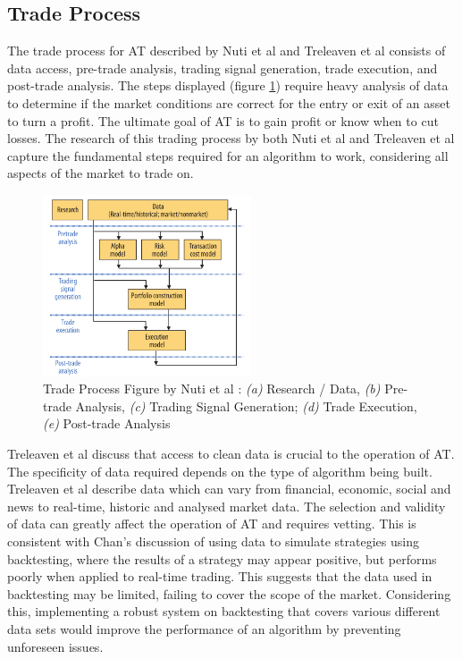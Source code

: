 \subsection{Trade Process}
\label{sec:related:algoTrading:tradeprocess}
The trade process for AT described by Nuti et al \cite{ART:Nuti:2011} and Treleaven et al  \cite{ART:Treleaven:2013} consists of data access, pre-trade analysis, trading signal generation, trade execution, and post-trade analysis. The steps displayed (figure \ref{fig:related:tradeprocess}) require heavy analysis of data to determine if the market conditions are correct for the entry or exit of an asset to turn a profit. The ultimate goal of AT is to gain profit or know when to cut losses. The research of this trading process by both Nuti et al \cite{ART:Nuti:2011} and Treleaven et al \cite{ART:Treleaven:2013} capture the fundamental steps required for an algorithm to work, considering all aspects of the market to trade on.

\begin{figure}[htb]
    \centering
	\includegraphics[width=0.55\textwidth]{content/graphics/AT-trade_process}
	\caption{Trade Process Figure by Nuti et al \cite{ART:Nuti:2011}: \textit{(a)} Research / Data, \textit{(b)} Pre-trade Analysis, \textit{(c)} Trading Signal Generation; \textit{(d)} Trade Execution, \textit{(e)} Post-trade Analysis }
	\label{fig:related:tradeprocess}
\end{figure}

Treleaven et al \cite{ART:Treleaven:2013} discuss that access to clean data is crucial to the operation of AT. The specificity of data required depends on the type of algorithm being built. Treleaven et al describe data which can vary from financial, economic, social and news to real-time, historic and analysed market data. The selection and validity of data can greatly affect the operation of AT and requires vetting. This is consistent with Chan's \cite{BOOK:Chan:2013}  discussion of using data to simulate strategies using backtesting, where the results of a strategy may appear positive, but performs poorly when applied to real-time trading. This suggests that the data used in backtesting may be limited, failing to cover the scope of the market. Considering this, implementing a robust system on backtesting that covers various different data sets would improve the performance of an algorithm by preventing unforeseen issues.


